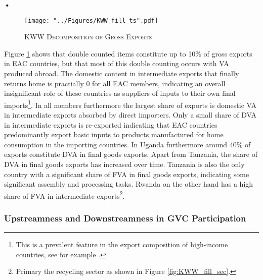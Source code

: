 \textbf{\textbf{•}}\documentclass[a4paper]{article}
\begin{document}
\begin{figure}[h!]
\centering
\caption{\label{fig:KWW_fill_ts}\textsc{KWW Decomposition of Gross Exports}}
\texttt{[image: "../Figures/KWW\_fill\_ts".pdf]} %
\end{figure}
\FloatBarrier

Figure \ref{fig:KWW_fill_ts} shows that double counted items constitute up to 10\% of gross exports in EAC countries, but that most of this double counting occurs with VA produced abroad. The domestic content in intermediate exports that finally returns home is practially 0 for all EAC members, indicating an overall insignificant role of these countries as suppliers of inputs to their own final imports\footnote{This is a prevalent feature in the export composition of high-income countries, see for example \citep{Kummritz20162}.}. In all members furthermore the largest share of exports is domestic VA in intermediate exports absorbed by direct importers. Only a small share of DVA in intermediate exports is re-exported indicating that EAC countries predominantly export basic inputs to products manufactured for home consumption in the importing countries. In Uganda furthermore around 40\% of exports constitute DVA in final goods exports. Apart from Tanzania, the share of DVA in final goods exports has increased over time. Tanzania is also the only country with a significant share of FVA in final goods exports, indicating some significant assembly and processing tasks. Rwanda on the other hand has a high share of FVA in intermediate exports\footnote{Primary the recycling sector as shown in Figure \ref{fig:KWW_fill_sec}.}. \newline  %

\subsubsection{Upstreamness and Downstreamness in GVC Participation}

\end{document}
